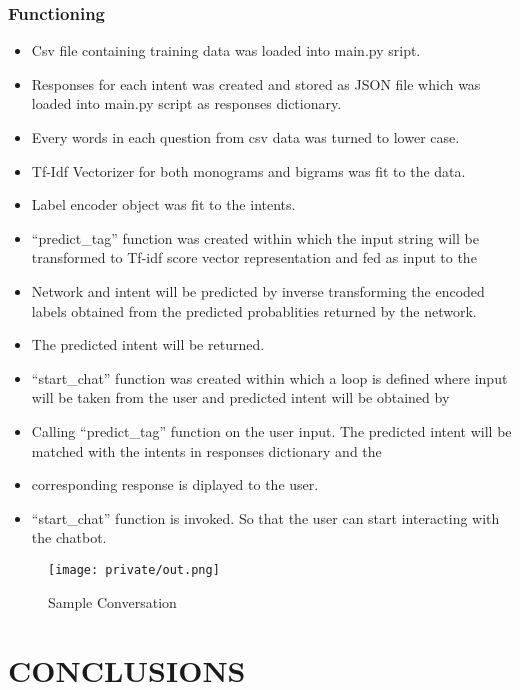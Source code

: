 \documentclass[14pt]{extarticle}
\begin{document}
\subsubsection{Functioning}
\begin{itemize}
    \item Csv file containing training data was loaded into main.py sript.
    \item Responses for each intent was created and stored as JSON file which was loaded into main.py script as responses dictionary.
    \item Every words in each question from csv data was turned to lower case.
    \item Tf-Idf Vectorizer for both monograms and bigrams was fit to the data.
    \item Label encoder object was fit to the intents.
    \item “predict\_tag” function was created within which the input string will be transformed to Tf-idf score vector representation and fed as input to the
    \item Network and intent will be predicted by inverse transforming the encoded labels obtained from the predicted probablities returned by the network.
    \item The predicted intent will be returned.
    \item “start\_chat” function was created within which a loop is defined where input will be taken from the user and predicted intent will be obtained by
    \item Calling “predict\_tag” function on the user input. The predicted intent will be matched with the intents in responses dictionary and the
    \item corresponding response is diplayed to the user.
    \item “start\_chat” function is invoked. So that the user can start interacting with the chatbot.
\end{itemize}


\begin{figure}[!htb]
    \begin{center}
        \texttt{[image: private/out.png]}
    \end{center}
    \caption{Sample Conversation}
\end{figure}


\newpage
\section{CONCLUSIONS}
\end{document}
